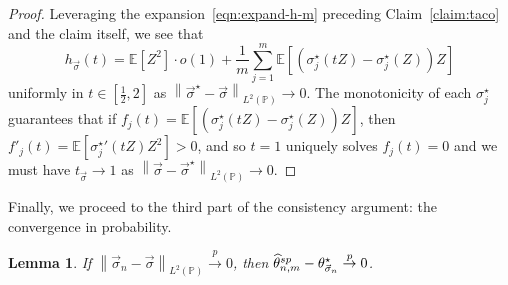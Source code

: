 \documentclass[11pt]{article}
\newcommand{\E}{\mathbb{E}}
\newcommand{\Prb}{\mathbb{P}}
\newcommand{\norm}[1]{\left\|{#1}\right\|} %
\newcommand{\what}[1]{\widehat{#1}}
\newcommand{\sem}{^{\textup{sp}}}
\newcommand{\<}{\langle} %
\renewcommand{\>}{\rangle}
\newcommand{\cp}{\stackrel{p}{\rightarrow}}
\newcommand{\LtwoP}[1]{\norm{#1}_{L^2(\Prb)}}
\newcommand{\half}{\frac{1}{2}}
\newcommand{\opt}{^\star}
\newcommand{\spe}{\what{\theta}\sem_{n,m}} %
\newtheorem{lemma}[claim]{Lemma}
\begin{document}
\begin{proof}
	Leveraging the expansion~\eqref{eqn:expand-h-m} preceding
	Claim~\ref{claim:taco} and the claim itself, we see that
	\begin{equation*}
		h_{\vec{\sigma}}(t) = \E[Z^2] \cdot o(1) +
		\frac{1}{m} \sum_{j = 1}^m
		\E[(\sigma_j\opt(tZ) - \sigma_j\opt(Z))Z]
	\end{equation*}
	uniformly in $t \in [\half, 2]$ as $\LtwoP{\vec{\sigma}\opt -
		\vec{\sigma}} \to 0$. The monotonicity of each $\sigma_j\opt$ guarantees
	that if $f_j(t) = \E[(\sigma_j\opt(tZ) - \sigma_j\opt(Z))Z]$, then
	$f'_j(t) = \E[{\sigma_j\opt}'(tZ) Z^2] > 0$, and so $t = 1$ uniquely
	solves $f_j(t) = 0$ and we must have $t_{\vec{\sigma}} \to 1$ as
	$\LtwoP{\vec{\sigma} - \vec{\sigma}\opt} \to 0$.
\end{proof}

Finally, we proceed to the third part of the consistency argument:
the convergence in probability.
\begin{lemma}
	\label{lemma:vec-sigma-probability}
	If $\LtwoP{\vec{\sigma}_n - \vec{\sigma}} \cp 0$,
	then $\spe - \theta_{\vec{\sigma}_n}\opt \cp 0$.
\end{lemma}
\end{document}
